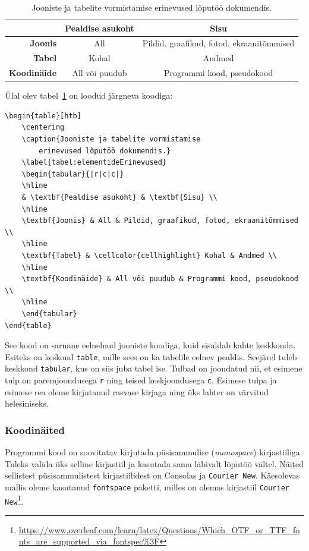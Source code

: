 \begin{table}[htb]
    \centering
    \caption{Jooniste ja tabelite vormistamise
        erinevused lõputöö dokumendis.}
    \label{tabel:elementideErinevused}
    \begin{tabular}{|r|c|c|}
    \hline
    & \textbf{Pealdise asukoht} & \textbf{Sisu} \\
    \hline
    \textbf{Joonis} & All & Pildid, graafikud, fotod, ekraanitõmmised \\
    \hline
    \textbf{Tabel} & \cellcolor{cellhighlight} Kohal & Andmed \\
    \hline
    \textbf{Koodinäide} & All või puudub & Programmi kood, pseudokood \\
    \hline
    \end{tabular}
\end{table}

Ülal olev tabel~\ref{tabel:elementideErinevused} on loodud järgneva koodiga:
\begin{verbatim}
\begin{table}[htb]
    \centering
    \caption{Jooniste ja tabelite vormistamise
        erinevused lõputöö dokumendis.}
    \label{tabel:elementideErinevused}
    \begin{tabular}{|r|c|c|}
    \hline
    & \textbf{Pealdise asukoht} & \textbf{Sisu} \\
    \hline
    \textbf{Joonis} & All & Pildid, graafikud, fotod, ekraanitõmmised \\
    \hline
    \textbf{Tabel} & \cellcolor{cellhighlight} Kohal & Andmed \\
    \hline
    \textbf{Koodinäide} & All või puudub & Programmi kood, pseudokood \\
    \hline
    \end{tabular}
\end{table}
\end{verbatim}

See kood on sarnane eelnelnud jooniste koodiga, kuid sisaldab kahte keskkonda. Esiteks on keskond \verb|table|, mille sees on ka tabelile eelnev pealdis. Seejärel tuleb keskkond \verb|tabular|, kus on siis juba tabel ise. Tulbad on joondatud nii, et esimene tulp on paremjoondusega \verb|r| ning teised keskjoondusega \verb|c|. Esimese tulpa ja esimese rea oleme kirjutanud rasvase kirjaga ning üks lahter on värvitud helesiniseks.

\subsubsection{Koodinäited}
Programmi kood on soovitatav kirjutada püsisammulise (\emph{monospace}) kirjastiiliga. Tuleks valida üks selline kirjastiil ja kasutada sama läbivalt lõputöö vältel. Näited sellistest püsisammulistest kirjastiilidest on Consolas ja \texttt{Courier New}. Käesolevas mallis oleme kasutanud \verb|fontspace| paketti, milles on olemas kirjastiil \texttt{Courier New}\footnote{\url{https://www.overleaf.com/learn/latex/Questions/Which_OTF_or_TTF_fonts_are_supported_via_fontspec\%3F}}.

